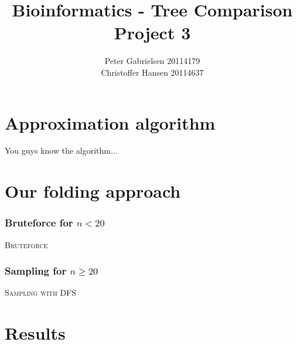 \documentclass[a4paper,oneside,article,11pt]{memoir}
\title{Bioinformatics - Tree Comparison \\ Project 3}
\author{Peter Gabrielsen 20114179\\
Christoffer Hansen 20114637}
\begin{document}
\maketitle

\chapter*{Approximation algorithm}
You guys know the algorithm...
\chapter*{Our folding approach}
\subsection*{Bruteforce for $n < 20$}
\begin{algorithm}[H]
\caption{\textsc{Bruteforce}}
\begin{algorithmic}[1]
			\ENDIF
		\ENDIF
	\ENDFOR
\end{algorithmic}
\end{algorithm}

\subsection*{Sampling for $n \geq 20$}
\begin{algorithm}[H]
\caption{\textsc{Sampling with DFS}}
\begin{algorithmic}[1]
		\ENDIF
	\ENDWHILE
\end{algorithmic}
\end{algorithm}
\clearpage

\chapter*{Results}
\end{document}
